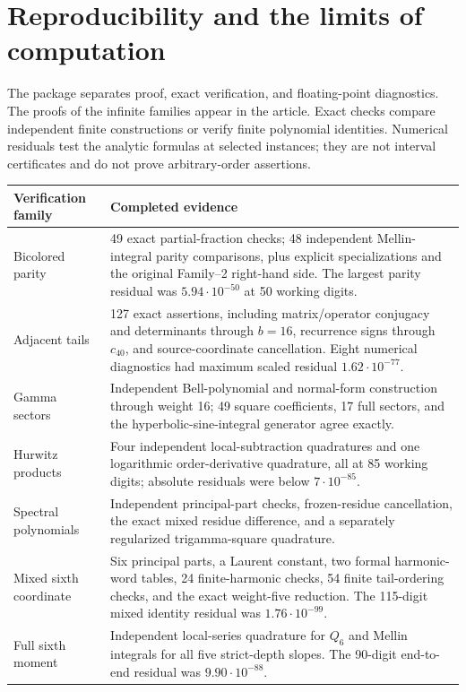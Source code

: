 \section{Reproducibility and the limits of computation}
\label{repro:sec}

The package separates proof, exact verification, and floating-point
diagnostics.  The proofs of the infinite families appear in the
article.  Exact checks compare independent finite constructions or
verify finite polynomial identities.  Numerical residuals test the
analytic formulas at selected instances; they are not interval
certificates and do not prove arbitrary-order assertions.

\begin{center}
\small
\begin{tabularx}{\textwidth}{@{}p{}X@{}}
\toprule
Verification family & Completed evidence \\
\midrule
Bicolored parity & 49 exact partial-fraction checks; 48 independent
Mellin-integral parity comparisons, plus explicit specializations and
the original Family--2 right-hand side.  The largest parity residual
was $5.94\cdot10^{-50}$ at 50 working digits. \\
Adjacent tails & 127 exact assertions, including matrix/operator
conjugacy and determinants through $b=16$, recurrence signs through
$c_{40}$, and source-coordinate cancellation.  Eight numerical
diagnostics had maximum scaled residual $1.62\cdot10^{-77}$. \\
Gamma sectors & Independent Bell-polynomial and normal-form construction
through weight 16; 49 square coefficients, 17 full sectors, and the
hyperbolic-sine-integral generator agree exactly. \\
Hurwitz products & Four independent local-subtraction quadratures and
one logarithmic order-derivative quadrature, all at 85 working digits;
absolute residuals were below $7\cdot10^{-85}$. \\
Spectral polynomials & Independent principal-part checks, frozen-residue
cancellation, the exact mixed residue difference, and a separately
regularized trigamma-square quadrature. \\
Mixed sixth coordinate & Six principal parts, a Laurent constant,
two formal harmonic-word tables, 24 finite-harmonic checks, 54 finite
tail-ordering checks, and the exact weight-five reduction.  The
115-digit mixed identity residual was $1.76\cdot10^{-99}$. \\
Full sixth moment & Independent local-series quadrature for $Q_6$ and
Mellin integrals for all five strict-depth slopes.  The 90-digit
end-to-end residual was $9.90\cdot10^{-88}$. \\
\bottomrule
\end{tabularx}
\end{center}

